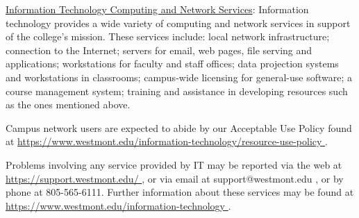 		\underline{Information Technology Computing and Network Services}:  Information technology provides a wide variety of computing and network services in support of the college's mission.  These services include:  local network infrastructure; connection to the Internet; servers for email, web pages, file serving and applications; workstations for faculty and staff offices; data projection systems and workstations in classrooms; campus-wide licensing for general-use software; a course management system; training and assistance in developing resources such as the ones mentioned above.

		Campus network users are expected to abide by our Acceptable Use Policy found at
		\href{
			https://www.westmont.edu/information-technology/resource-use-policy
		}{\url{
				https://www.westmont.edu/information-technology/resource-use-policy
			}}
		.

		Problems involving any service provided by IT may be reported via the web at
		\href{
			https://support.westmont.edu/
		}{\url{
				https://support.westmont.edu/
			}}
		,
		or via email at support@westmont.edu
		,
		or by phone at 805-565-6111.  Further information about these services may be found at
		\href{
			https://www.westmont.edu/information-technology
		}{\url{
				https://www.westmont.edu/information-technology
			}}
		.
